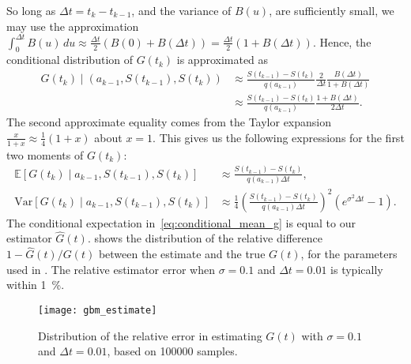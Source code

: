 \documentclass[main.tex]{subfiles}
\begin{document}
So long as $\Delta t=t_{k}-t_{k-1}$, and the variance of $B(u)$, are
sufficiently small, we may use the approximation
$\int_{0}^{\Delta{t}}B(u)\,du\approx  \frac{\Delta
  t}{2}(B(0)+B(\Delta t))=\frac{\Delta
  t}{2}(1+B(\Delta t))$.
Hence, the conditional distribution of $G(t_{k})$ is approximated as
\begin{align}
  G(t_{k})\mid (a_{k-1},S(t_{k-1}),S(t_{k}))
  &\approx
    \frac{S(t_{k-1})-S(t_{k})}{q(a_{k-1})}\frac{2}{\Delta t}\frac{B(\Delta t)}{1+B(\Delta t)}\\
  &\approx \frac{S(t_{k-1})-S(t_{k})}{q(a_{k-1})}\frac{1+B(\Delta t)}{2\Delta t}.
\end{align}
The second approximate equality comes from the Taylor
expansion $\frac{x}{1+x}\approx \frac{1}{4}(1+x)$ about $x=1$.
This gives us the following expressions for the first two moments
of $G(t_{k})$:
\begin{align}\label{eq:conditional_mean_g}
  \mathbb{E}[G(t_{k})\mid a_{k-1},S(t_{k-1}),S(t_{k})]
  &\approx \frac{S(t_{k-1})-S(t_{k})}{ q(a_{k-1})\Delta t},\\
  \mbox{Var}[G(t_{k})\mid a_{k-1},S(t_{k-1}),S(t_{k})]
  &\approx \frac{1}{4}{\left(\frac{S(t_{k-1})-S(t_{k})}{
    q(a_{k-1})\Delta t}\right)}^2\left( e^{\sigma^2\Delta t} -1 \right).
\end{align}
The conditional expectation in~\eqref{eq:conditional_mean_g} is equal
to our estimator $\hat G(t)$.
 shows the distribution of the relative
difference $1-\hat G(t)/G(t)$ between
the estimate and the true $G(t)$, for
the parameters used in . The relative
estimator error when $\sigma=0.1$ and $\Delta t=0.01$
is typically within \SI{1}{\percent}.
\begin{figure}[htbp]
  \centering
  \texttt{[image: gbm\_estimate]}
  \caption{Distribution of the relative error in estimating $G(t)$ with
    $\sigma=0.1$ and $\Delta t= 0.01$, based on \num{100000} samples.}\label{fig:gbm_estimate}
\end{figure}
\end{document}

